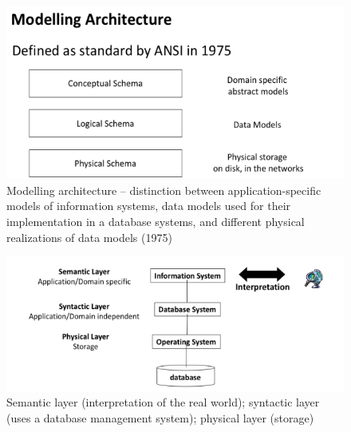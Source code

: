     \begin{figure}[htp]
      \centering
        \includegraphics[width=\textwidth]{images/modarch.png}
        \caption{Modelling architecture -- distinction between application-specific models of information systems, data models used for their implementation in a database systems, and different physical realizations of data models (1975)}
        \label{fig:modarch}
    \end{figure}
    \newpage
    \begin{figure}[htp]
      \centering
        \includegraphics[width=\textwidth]{images/refview.png}
        \caption{Semantic layer (interpretation of the real world); syntactic layer (uses a database management system); physical layer (storage)}
        \label{fig:refview}
    \end{figure}

